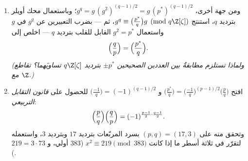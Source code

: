 \begin{problem}
\begin{enumerate}[resume]
  \item ومن جهة أخرى، $g^q = g\,(g^2)^{(q-1)/2} =
        g\,(p^*)^{(q-1)/2}$؛ وباستعمال محك أويلر بترديد
        $q$، استنتج $g^q \equiv \bigl(\frac{p^*}q\bigr)g
        \pmod{q\Z[\zeta]}$، ثم --- بضرب التعبيرين عن $g^q$
        في $g$ واستعمال $g^2 = p^*$ القابل للقلب بترديد $q$ ---
        اخلص إلى
        \[
        \Bigl(\frac qp\Bigr) = \Bigl(\frac{p^*}q\Bigr) .
        \]
        \emph{(ولماذا تستلزم مطابقةٌ بين العددين الصحيحين
        $\pm p^*$ بترديد $q\Z[\zeta]$ تساويَهما؟ تقاطع مع
        $\Z$.)}
  \item افتح $\bigl(\frac{p^*}q\bigr) =
        \bigl(\frac{-1}q\bigr)^{(p-1)/2}\bigl(\frac pq\bigr)$ و $\bigl(\frac{-1}q\bigr) = (-1)^{(q-1)/2}$ للحصول على \emph{قانون التقابل
        التربيعي}:
        \[
        \Bigl(\frac pq\Bigr)\Bigl(\frac qp\Bigr)
        = (-1)^{\frac{p-1}2\cdot\frac{q-1}2} .
        \]
        وتحقق منه على $(p, q) = (17, 3)$ بسرد المربّعات بترديد $17$ وبترديد
        $3$، واستعمله لتقرّر في ثلاثة أسطر ما إذا كانت $x^2 \equiv 219 \pmod{383}$
         ($383$ أولي، و $219 = 3\cdot73$).
\end{enumerate}


\end{problem}
